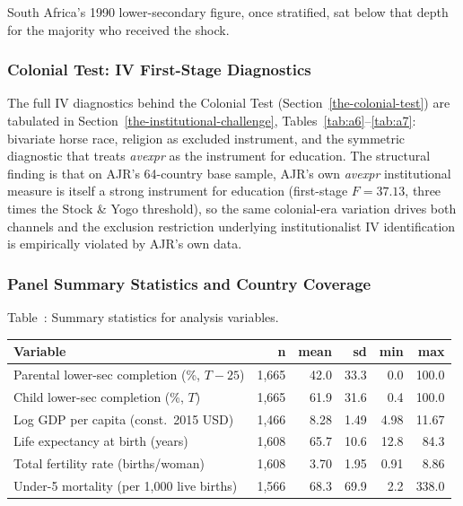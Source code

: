 \documentclass[12pt,letterpaper]{article}
\begin{document}
{South Africa's 1990 lower-secondary figure, once stratified, sat
below that depth for the majority who received the shock.

\subsubsection{Colonial Test: IV First-Stage Diagnostics}\label{appendix-colonial-iv}

The full IV diagnostics behind the Colonial Test
(Section~\ref{the-colonial-test}) are tabulated in
Section~\ref{the-institutional-challenge},
Tables~\ref{tab:a6}--\ref{tab:a7}: bivariate horse race, religion as
excluded instrument, and the symmetric diagnostic that treats
\emph{avexpr} as the instrument for education. The structural finding
is that on AJR's 64-country base sample, AJR's own \emph{avexpr}
institutional measure is itself a strong instrument for education
(first-stage $F=37.13$, three times the Stock \& Yogo threshold), so
the same colonial-era variation drives both channels and the
exclusion restriction underlying institutionalist IV identification
is empirically violated by AJR's own data.

\subsubsection{Panel Summary Statistics and Country Coverage}\label{appendix-descriptive}

\label{tab:summary-full}Table~\thetable: Summary statistics for analysis variables.

{\small
\begin{longtable}[]{@{}lrrrrr@{}}
\toprule
Variable & n & mean & sd & min & max \\
\midrule
\endhead
Parental lower-sec completion (\%, $T{-}25$) & 1{,}665 & 42.0 & 33.3 &  0.0 & 100.0 \\
Child lower-sec completion (\%, $T$)          & 1{,}665 & 61.9 & 31.6 &  0.4 & 100.0 \\
Log GDP per capita (const.\ 2015 USD)         & 1{,}466 &  8.28 &  1.49 & 4.98 &  11.67 \\
Life expectancy at birth (years)              & 1{,}608 & 65.7 & 10.6 & 12.8 &  84.3 \\
Total fertility rate (births/woman)           & 1{,}608 &  3.70 &  1.95 & 0.91 &   8.86 \\
Under-5 mortality (per 1{,}000 live births)   & 1{,}566 & 68.3 & 69.9 &  2.2 & 338.0 \\
\bottomrule
\end{longtable}
}

}
\end{document}
